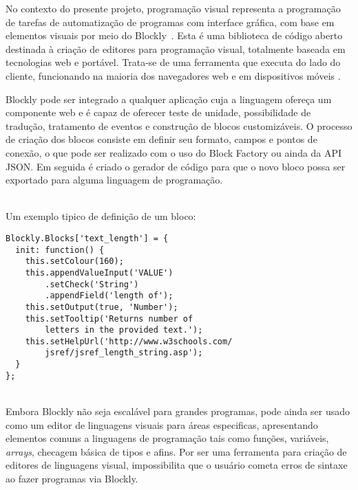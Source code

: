 \documentclass[12pt]{article}
\begin{document}
	No contexto do presente projeto, programação visual representa a programação de tarefas de automatização de programas com interface gráfica, com base em elementos visuais por meio do Blockly~\cite{blocklyResource}. Esta é uma biblioteca de código aberto destinada à criação de editores para programação visual, totalmente baseada em tecnologias web e portável. Trata-se de uma ferramenta que executa do lado do cliente, funcionando na maioria dos navegadores web e em dispositivos móveis \cite{blocklyResource}.

	Blockly pode ser integrado a qualquer aplicação cuja a linguagem ofereça um componente web e é capaz de oferecer teste de unidade, possibilidade de tradução, tratamento de eventos e construção de blocos customizáveis. O processo de criação dos blocos consiste em definir seu formato, campos e pontos de conexão, o que pode ser realizado com o uso do Block Factory ou ainda da API JSON.
	Em seguida é criado o gerador de código para que o novo bloco possa ser exportado para alguma linguagem de programação.

	~\\
	Um exemplo tipico de definição de um bloco:


	\begin{lstlisting}[frame=single]
Blockly.Blocks['text_length'] = {
  init: function() {
	this.setColour(160);
	this.appendValueInput('VALUE')
		.setCheck('String')
		.appendField('length of');
	this.setOutput(true, 'Number');
	this.setTooltip('Returns number of
		letters in the provided text.');
	this.setHelpUrl('http://www.w3schools.com/
		jsref/jsref_length_string.asp');
  }
};
    \end{lstlisting}

	~\\
	Embora Blockly não seja escalável para grandes programas, pode ainda ser usado como um editor de linguagens visuais para áreas especificas, apresentando elementos comuns a linguagens de programação tais como funções, variáveis, \emph{arrays}, checagem básica de tipos e afins. Por ser uma ferramenta para criação de editores de linguagens visual, impossibilita que o usuário cometa erros de sintaxe ao fazer programas via Blockly.

\end{document}
